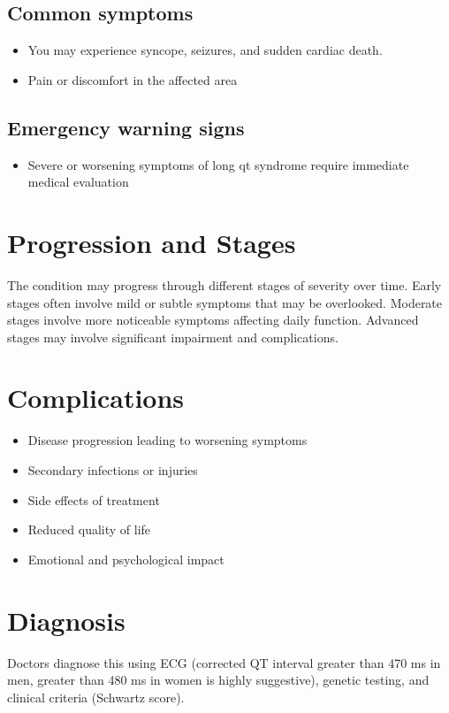 \subsection{Common symptoms}
\begin{itemize}[noitemsep]
  \item You may experience syncope, seizures, and sudden cardiac death.

  \item Pain or discomfort in the affected area
  \end{itemize}

\subsection{Emergency warning signs}
\begin{itemize}[noitemsep]
  \item Severe or worsening symptoms of long qt syndrome require immediate medical evaluation
\end{itemize}
\section{Progression and Stages}
The condition may progress through different stages of severity over time. Early stages often involve mild or subtle symptoms that may be overlooked. Moderate stages involve more noticeable symptoms affecting daily function. Advanced stages may involve significant impairment and complications.
\section{Complications}
\begin{itemize}[noitemsep]
  \item Disease progression leading to worsening symptoms
  \item Secondary infections or injuries
  \item Side effects of treatment
  \item Reduced quality of life
  \item Emotional and psychological impact
\end{itemize}
\section{Diagnosis}
Doctors diagnose this using ECG (corrected QT interval greater than 470 ms in men, greater than 480 ms in women is highly suggestive), genetic testing, and clinical criteria (Schwartz score).


